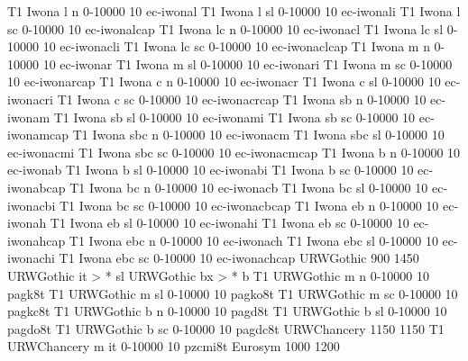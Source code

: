 \declarefont T1 Iwona  l   n  0-10000   10 ec-iwonal
\declarefont T1 Iwona  l   sl 0-10000   10 ec-iwonali
\declarefont T1 Iwona  l   sc 0-10000   10 ec-iwonalcap
\declarefont T1 Iwona  lc  n  0-10000   10 ec-iwonacl
\declarefont T1 Iwona  lc  sl 0-10000   10 ec-iwonacli
\declarefont T1 Iwona  lc  sc 0-10000   10 ec-iwonaclcap
\declarefont T1 Iwona  m   n  0-10000   10 ec-iwonar
\declarefont T1 Iwona  m   sl 0-10000   10 ec-iwonari
\declarefont T1 Iwona  m   sc 0-10000   10 ec-iwonarcap
\declarefont T1 Iwona  c   n  0-10000   10 ec-iwonacr
\declarefont T1 Iwona  c   sl 0-10000   10 ec-iwonacri
\declarefont T1 Iwona  c   sc 0-10000   10 ec-iwonacrcap
\declarefont T1 Iwona  sb  n  0-10000   10 ec-iwonam
\declarefont T1 Iwona  sb  sl 0-10000   10 ec-iwonami
\declarefont T1 Iwona  sb  sc 0-10000   10 ec-iwonamcap
\declarefont T1 Iwona  sbc n  0-10000   10 ec-iwonacm
\declarefont T1 Iwona  sbc sl 0-10000   10 ec-iwonacmi
\declarefont T1 Iwona  sbc sc 0-10000   10 ec-iwonacmcap
\declarefont T1 Iwona  b   n  0-10000   10 ec-iwonab
\declarefont T1 Iwona  b   sl 0-10000   10 ec-iwonabi
\declarefont T1 Iwona  b   sc 0-10000   10 ec-iwonabcap
\declarefont T1 Iwona  bc  n  0-10000   10 ec-iwonacb
\declarefont T1 Iwona  bc  sl 0-10000   10 ec-iwonacbi
\declarefont T1 Iwona  bc  sc 0-10000   10 ec-iwonacbcap
\declarefont T1 Iwona  eb  n  0-10000   10 ec-iwonah
\declarefont T1 Iwona  eb  sl 0-10000   10 ec-iwonahi
\declarefont T1 Iwona  eb  sc 0-10000   10 ec-iwonahcap
\declarefont T1 Iwona  ebc n  0-10000   10 ec-iwonach
\declarefont T1 Iwona  ebc sl 0-10000   10 ec-iwonachi
\declarefont T1 Iwona  ebc sc 0-10000   10 ec-iwonachcap
%
%
\declarefontfamily URWGothic 900 1450
\fontmapshape URWGothic it > * sl
\fontmapseries URWGothic bx > * b
\declarefont T1 URWGothic m   n  0-10000   10 pagk8t
\declarefont T1 URWGothic m   sl 0-10000   10 pagko8t
\declarefont T1 URWGothic m   sc 0-10000   10 pagkc8t
\declarefont T1 URWGothic b   n  0-10000   10 pagd8t
\declarefont T1 URWGothic b   sl 0-10000   10 pagdo8t
\declarefont T1 URWGothic b   sc 0-10000   10 pagdc8t
%
%
\declarefontfamily URWChancery 1150 1150
\declarefont T1 URWChancery m   it 0-10000   10 pzcmi8t
%
%
\declarefontfamily Eurosym 1000 1200
